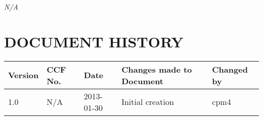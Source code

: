 \documentclass{project}
\begin{document}
\clearpage
{}
\begin{thebibliography}{5}
\bibitem{} \emph{N/A}
\end{thebibliography}
\clearpage
{}
\section*{DOCUMENT HISTORY}
\begin{tabular}{|l | l | l | l | l |}
\hline
Version & CCF No. & Date & Changes made to Document & Changed by \\
\hline
1.0 & N/A & 2013-01-30 & Initial creation & cpm4 \\
\hline
\end{tabular}
\label{thelastpage}
\end{document}
